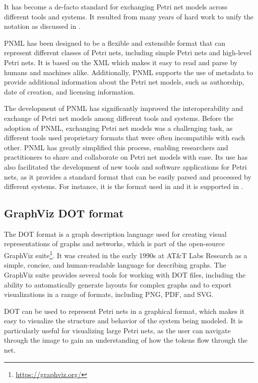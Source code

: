 It has become a de-facto standard
for exchanging Petri net models across different tools and systems.
It resulted from many years of hard work
to unify the notation as discussed in \cite{hillah:hal-01176335}.

\acrshort{PNML} has been designed to be a flexible and extensible format
that can represent different classes of Petri nets,
including simple Petri nets and high-level Petri nets.
It is based on the \acrfull{XML}
which makes it easy to read and parse by humans and machines alike.
Additionally, \acrshort{PNML} supports the use of metadata
to provide additional information about the Petri net models,
such as authorship, date of creation, and licensing information.

The development of \acrshort{PNML} has significantly improved
the interoperability and exchange of Petri net models
among different tools and systems.
Before the adoption of \acrshort{PNML},
exchanging Petri net models was a challenging task,
as different tools used proprietary formats
that were often incompatible with each other.
\acrshort{PNML} has greatly simplified this process,
enabling researchers and practitioners
to share and collaborate on Petri net models with ease.
Its use has also facilitated the development of new tools
and software applications for Petri nets,
as it provides a standard format
that can be easily parsed and processed by different systems.
For instance, it is the format used
in \cite{zhang2022deadlocks} and it is supported in \cite{meyer2020}.

\subsection{GraphViz DOT format}

The DOT format is a graph description language
used for creating visual representations of graphs and networks,
which is part of the open-source GraphViz suite\footnote{\url{https://graphviz.org/}}.
It was created in the early 1990s at AT\&T Labs Research
as a simple, concise, and human-readable language for describing graphs.
The GraphViz suite provides several tools for working with DOT files,
including the ability to automatically generate layouts for complex graphs and
to export visualizations in a range of formats, including PNG, PDF, and SVG.

DOT can be used to represent Petri nets in a graphical format, which makes it easy
to visualize the structure and behavior of the system being modeled.
It is particularly useful for visualizing large Petri nets,
as the user can navigate through the image
to gain an understanding of how the tokens flow through the net.

